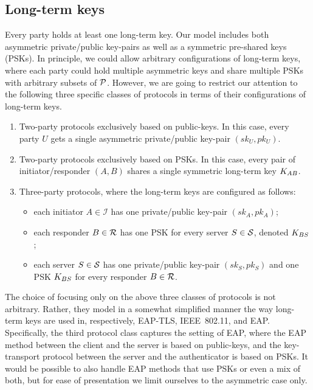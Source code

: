 \subsection{Long-term keys}\label{sec:definitions:long-term-keys}
Every party holds at least one long-term key.
Our model includes both asymmetric private/public key-pairs as well as a symmetric pre-shared keys (PSKs).
In principle,
we could allow arbitrary configurations of long-term keys,
where each party could hold multiple asymmetric keys and share multiple PSKs with arbitrary subsets of $\mathcal{P}$.
However,
we are going to restrict our attention to the following three specific classes of protocols in terms of their configurations of long-term keys.
\begin{enumerate}
	\item Two-party protocols exclusively based on public-keys.
	In this case,
	every party $U$ gets a single asymmetric private/public key-pair $(sk_U, pk_U)$.
	
	\item Two-party protocols exclusively based on PSKs.
	In this case, every pair of initiator/responder $(A,B)$ shares a single symmetric long-term key $K_{AB}$. 

	\item\label{sec:definitions:long-term-keys:configuration:3P} Three-party protocols, 
	where the long-term keys are configured as follows:
	\begin{itemize}
		\item each initiator $A \in \mathcal{I}$ has one private/public key-pair $(sk_A, pk_A)$;
		
		\item each responder $B \in \mathcal{R}$ has one PSK for every server $S \in \mathcal{S}$,
		denoted $K_{BS}$;
		
		\item each server $S \in \mathcal{S}$ has one private/public key-pair $(sk_S, pk_S)$ and one PSK $K_{BS}$ for every responder $B \in \mathcal{R}$. 
	\end{itemize}  
		
\end{enumerate}

The choice of focusing only on the above three classes of protocols is not arbitrary.
Rather,
they model in a somewhat simplified manner the way  long-term keys are used in,
respectively,
EAP-TLS, 
IEEE~802.11,
and EAP.
Specifically,
the third protocol class captures the setting of EAP,
where the EAP method between the client and the server is based on public-keys,
and the key-transport protocol between the server and the authenticator is based on PSKs.
It would be possible to also handle EAP methods that use PSKs or even a mix of both,
but for ease of presentation we limit ourselves to the asymmetric case only.

